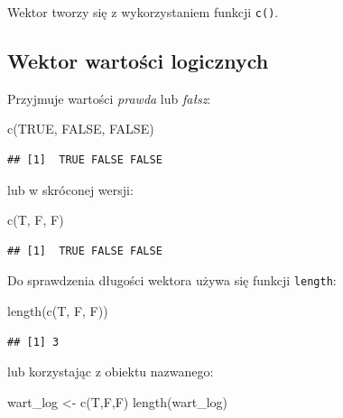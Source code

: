 \documentclass[
]{book}
\newenvironment{Shaded}{\begin{snugshade}}{\end{snugshade}}
\newcommand{\ConstantTok}[1]{\textcolor[rgb]{0.00,0.00,0.00}{#1}}
\newcommand{\FunctionTok}[1]{\textcolor[rgb]{0.00,0.00,0.00}{#1}}
\newcommand{\NormalTok}[1]{#1}
\newcommand{\OtherTok}[1]{\textcolor[rgb]{0.56,0.35,0.01}{#1}}
\begin{document}
Wektor tworzy się z wykorzystaniem funkcji \texttt{c()}.

\hypertarget{wektor-wartoux15bci-logicznych}{%
\subsection{Wektor wartości logicznych}\label{wektor-wartoux15bci-logicznych}}

Przyjmuje wartości \emph{prawda} lub \emph{fałsz}:

\begin{Shaded}
\begin{Highlighting}[]
\FunctionTok{c}\NormalTok{(}\ConstantTok{TRUE}\NormalTok{, }\ConstantTok{FALSE}\NormalTok{, }\ConstantTok{FALSE}\NormalTok{)}
\end{Highlighting}
\end{Shaded}

\begin{verbatim}
## [1]  TRUE FALSE FALSE
\end{verbatim}

lub w skróconej wersji:

\begin{Shaded}
\begin{Highlighting}[]
\FunctionTok{c}\NormalTok{(T, F, F)}
\end{Highlighting}
\end{Shaded}

\begin{verbatim}
## [1]  TRUE FALSE FALSE
\end{verbatim}

Do sprawdzenia długości wektora używa się funkcji \texttt{length}:

\begin{Shaded}
\begin{Highlighting}[]
\FunctionTok{length}\NormalTok{(}\FunctionTok{c}\NormalTok{(T, F, F))}
\end{Highlighting}
\end{Shaded}

\begin{verbatim}
## [1] 3
\end{verbatim}

lub korzystając z obiektu nazwanego:

\begin{Shaded}
\begin{Highlighting}[]
\NormalTok{wart\_log }\OtherTok{\textless{}{-}} \FunctionTok{c}\NormalTok{(T,F,F)}
\FunctionTok{length}\NormalTok{(wart\_log)}
\end{Highlighting}
\end{Shaded}
\end{document}
